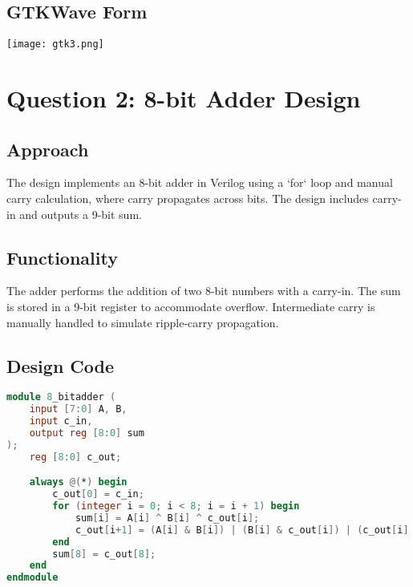 \documentclass{article}
\begin{document}
\subsection*{GTKWave Form}
\vspace{4cm} %
\begin{center}
    \texttt{[image: gtk3.png]}
\end{center}
\newpage


\section*{Question 2: 8-bit Adder Design}

\subsection*{Approach}
The design implements an 8-bit adder in Verilog using a `for` loop and manual carry calculation, where carry propagates across bits. The design includes carry-in and outputs a 9-bit sum.

\subsection*{Functionality}
The adder performs the addition of two 8-bit numbers with a carry-in. The sum is stored in a 9-bit register to accommodate overflow. Intermediate carry is manually handled to simulate ripple-carry propagation.

\subsection*{Design Code}
\begin{lstlisting}[language=Verilog]
module 8_bitadder (
    input [7:0] A, B,
    input c_in,
    output reg [8:0] sum
);
    reg [8:0] c_out;

    always @(*) begin
        c_out[0] = c_in;
        for (integer i = 0; i < 8; i = i + 1) begin
            sum[i] = A[i] ^ B[i] ^ c_out[i];
            c_out[i+1] = (A[i] & B[i]) | (B[i] & c_out[i]) | (c_out[i] & A[i]);
        end
        sum[8] = c_out[8];
    end
endmodule
\end{lstlisting}
\end{document}
